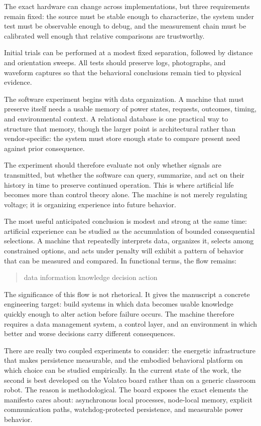 \documentclass[a4paper,english]{article}
\begin{document}
The exact hardware can change across implementations, but three requirements
remain fixed: the source must be stable enough to characterize, the
system under test must be observable enough to debug, and the measurement
chain must be calibrated well enough that relative comparisons are
trustworthy.

Initial trials can be performed at a modest fixed separation, followed
by distance and orientation sweeps. All tests should preserve logs,
photographs, and waveform captures so that the behavioral conclusions
remain tied to physical evidence.

The software experiment begins with data organization. A machine that
must preserve itself needs a usable memory of power states, requests,
outcomes, timing, and environmental context. A relational database
is one practical way to structure that memory, though the larger point
is architectural rather than vendor-specific: the system must store
enough state to compare present need against prior consequence.

The experiment should therefore evaluate not only whether signals are
transmitted, but whether the software can query, summarize, and act
on their history in time to preserve continued operation. This is
where artificial life becomes more than control theory alone. The
machine is not merely regulating voltage; it is organizing experience
into future behavior.


The most useful anticipated conclusion is modest and strong at the
same time: artificial experience can be studied as the accumulation
of bounded consequential selections. A machine that repeatedly interprets
data, organizes it, selects among constrained options, and acts under
penalty will exhibit a pattern of behavior that can be measured and
compared. In functional terms, the flow remains:
\begin{quote}
data \textrightarrow{} information \textrightarrow{} knowledge \textrightarrow{}
decision \textrightarrow{} action
\end{quote}
The significance of this flow is not rhetorical. It gives the manuscript
a concrete engineering target: build systems in which data becomes
usable knowledge quickly enough to alter action before failure occurs.
The machine therefore requires a data management system, a control
layer, and an environment in which better and worse decisions carry
different consequences.

There are really two coupled experiments to consider: the energetic
infrastructure that makes persistence measurable, and the embodied
behavioral platform on which choice can be studied empirically. In
the current state of the work, the second is best developed on the
Volatco board rather than on a generic classroom robot. The reason
is methodological. The board exposes the exact elements the manifesto
cares about: asynchronous local processes, node-local memory, explicit
communication paths, watchdog-protected persistence, and measurable
power behavior.
\end{document}
